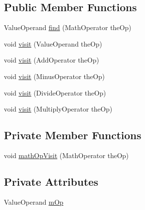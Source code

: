 \subsection*{Public Member Functions}
\begin{DoxyCompactItemize}
\item 
Value\-Operand \hyperlink{classexamples_1_1math_1_1ga_1_1_math_gene_1_1_get_value_operand_visitor_ae9a6f1ecfe78c4b85676f337429d4510}{find} (Math\-Operator the\-Op)
\item 
void \hyperlink{classexamples_1_1math_1_1ga_1_1_math_gene_1_1_get_value_operand_visitor_ab0a426da3e5487c0ecf068552827b6f1}{visit} (Value\-Operand the\-Op)
\item 
void \hyperlink{classexamples_1_1math_1_1ga_1_1_math_gene_1_1_get_value_operand_visitor_a209547380038d1b22870ba581547c1ae}{visit} (Add\-Operator the\-Op)
\item 
void \hyperlink{classexamples_1_1math_1_1ga_1_1_math_gene_1_1_get_value_operand_visitor_a5cf2bc380570e1cf730ea21c584fc62e}{visit} (Minus\-Operator the\-Op)
\item 
void \hyperlink{classexamples_1_1math_1_1ga_1_1_math_gene_1_1_get_value_operand_visitor_a14fab80304d7b30b410e7a26d3520e18}{visit} (Divide\-Operator the\-Op)
\item 
void \hyperlink{classexamples_1_1math_1_1ga_1_1_math_gene_1_1_get_value_operand_visitor_ace3d83e662ada6ada6aa1a571968fc60}{visit} (Multiply\-Operator the\-Op)
\end{DoxyCompactItemize}
\subsection*{Private Member Functions}
\begin{DoxyCompactItemize}
\item 
void \hyperlink{classexamples_1_1math_1_1ga_1_1_math_gene_1_1_get_value_operand_visitor_a2e292fe7c3d279d29d4d9df324a4ebde}{math\-Op\-Visit} (Math\-Operator the\-Op)
\end{DoxyCompactItemize}
\subsection*{Private Attributes}
\begin{DoxyCompactItemize}
\item 
Value\-Operand \hyperlink{classexamples_1_1math_1_1ga_1_1_math_gene_1_1_get_value_operand_visitor_a08a1e2848b038e456b47e8f698fdc182}{m\-Op}
\end{DoxyCompactItemize}
